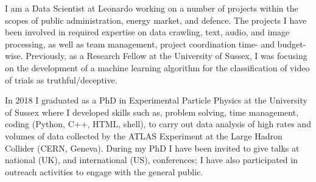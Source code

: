 
I am a Data Scientist at Leonardo working on a number of projects within the scopes of public administration, energy market, and defence. The projects I have been involved in required expertise on data crawling, text, audio, and image processing, as well as team management, project coordination time- and budget-wise. Previously, as a Research Fellow at the University of Sussex, I was focusing on the development of a machine learning algorithm for the classification of video of trials as truthful/deceptive. 

In 2018 I graduated as a PhD in Experimental Particle Physics at the University of Sussex where I developed skills such as, problem solving, time management, coding (Python, C++, HTML, shell), to carry out data analysis of high rates and volumes of data collected by the ATLAS Experiment at the Large Hadron Collider (CERN, Geneva). During my PhD I have been invited to give talks at national (UK), and international (US), conferences; I have also participated in outreach activities to engage with the general public.